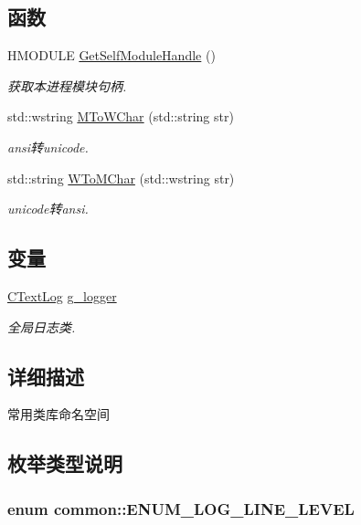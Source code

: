 \subsection*{函数}
\begin{DoxyCompactItemize}
\item 
H\+M\+O\+D\+U\+L\+E \hyperlink{namespacecommon_aad9ef22b1ff90d7f724dddc2c57f8b32}{Get\+Self\+Module\+Handle} ()
\begin{DoxyCompactList}\small\item\em 获取本进程模块句柄. \end{DoxyCompactList}\item 
std\+::wstring \hyperlink{namespacecommon_a0d61069db0910ffd817b31a85191f0a9}{M\+To\+W\+Char} (std\+::string str)
\begin{DoxyCompactList}\small\item\em ansi转unicode. \end{DoxyCompactList}\item 
std\+::string \hyperlink{namespacecommon_af48946b5ec6ba45e6ee89fc8112f247f}{W\+To\+M\+Char} (std\+::wstring str)
\begin{DoxyCompactList}\small\item\em unicode转ansi. \end{DoxyCompactList}\end{DoxyCompactItemize}
\subsection*{变量}
\begin{DoxyCompactItemize}
\item 
\hyperlink{classcommon_1_1_c_text_log}{C\+Text\+Log} \hyperlink{namespacecommon_a13e1e17aa404f3e915f640602c208924}{g\+\_\+logger}
\begin{DoxyCompactList}\small\item\em 全局日志类. \end{DoxyCompactList}\end{DoxyCompactItemize}


\subsection{详细描述}
常用类库命名空间 

\subsection{枚举类型说明}
\hypertarget{namespacecommon_af715c011984b434cbb7f04b0d4e57589}{
\subsubsection[{E\+N\+U\+M\+\_\+\+L\+O\+G\+\_\+\+L\+I\+N\+E\+\_\+\+L\+E\+V\+E\+L}]{\setlength{\rightskip}{0pt plus 5cm}enum {\bf common\+::\+E\+N\+U\+M\+\_\+\+L\+O\+G\+\_\+\+L\+I\+N\+E\+\_\+\+L\+E\+V\+E\+L}}}\label{namespacecommon_af715c011984b434cbb7f04b0d4e57589}


